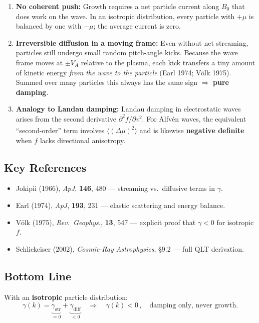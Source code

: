 \begin{enumerate}
  \item \textbf{No coherent push:} Growth requires a net particle current along $B_0$ that does work on the wave. In an isotropic distribution, every particle with $+\mu$ is balanced by one with $-\mu$; the average current is zero.
  
  \item \textbf{Irreversible diffusion in a moving frame:} Even without net streaming, particles still undergo small random pitch-angle kicks. Because the wave frame moves at $\pm V_A$ relative to the plasma, each kick transfers a tiny amount of kinetic energy \textit{from the wave to the particle} (Earl 1974; Völk 1975). Summed over many particles this always has the same sign $\Rightarrow$ \textbf{pure damping}.
  
  \item \textbf{Analogy to Landau damping:} Landau damping in electrostatic waves arises from the second derivative $\partial^2 f / \partial v_\parallel^2$. For Alfvén waves, the equivalent “second-order” term involves $\langle(\Delta \mu)^2\rangle$ and is likewise \textbf{negative definite} when $f$ lacks directional anisotropy.
\end{enumerate}

\subsection*{Key References}

\begin{itemize}
  \item Jokipii (1966), \textit{ApJ}, \textbf{146}, 480 — streaming vs.\ diffusive terms in $\gamma$.
  \item Earl (1974), \textit{ApJ}, \textbf{193}, 231 — elastic scattering and energy balance.
  \item Völk (1975), \textit{Rev.\ Geophys.}, \textbf{13}, 547 — explicit proof that $\gamma < 0$ for isotropic $f$.
  \item Schlickeiser (2002), \textit{Cosmic-Ray Astrophysics}, §9.2 — full QLT derivation.
\end{itemize}

\subsection*{Bottom Line}

With an \textbf{isotropic} particle distribution:
\[
\boxed{
\gamma(k) =
\underbrace{\gamma_{\text{str}}}_{= 0} +
\underbrace{\gamma_{\text{diff}}}_{< 0}
\quad\Longrightarrow\quad
\gamma(k) < 0\,,\quad
\text{damping only, never growth.}
}
\]

